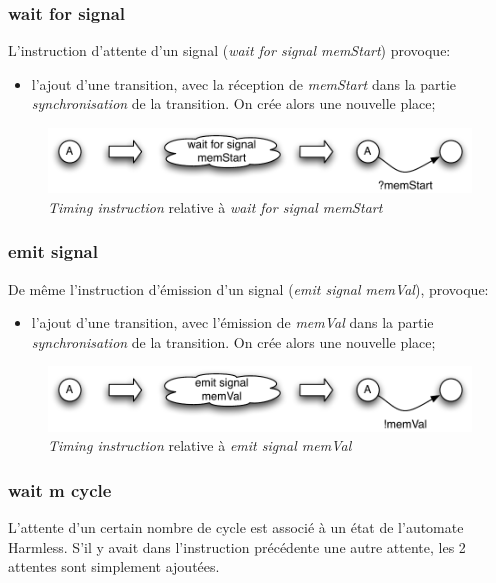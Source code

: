 \documentclass[11pt,a4paper]{article}
\begin{document}
\subsubsection{wait for signal}
L'instruction d'attente d'un signal (\emph{wait for signal memStart}) provoque:
\begin{itemize}
\item l'ajout d'une transition, avec la réception de \emph{memStart} dans la partie \emph{synchronisation} de la transition. On crée alors une nouvelle place;
\end{itemize}

\begin{figure}[htbp] %
   \centering
   \includegraphics[width=\linewidth]{automateWaitForSignal.pdf} 
   \caption{\emph{Timing instruction} relative à \emph{wait for signal memStart}}
   \label{fig:automateWaitForSignal}
\end{figure}

\subsubsection{emit signal}
De même l'instruction d'émission d'un signal (\emph{emit signal memVal}), provoque:
\begin{itemize}
\item l'ajout d'une transition, avec l'émission de \emph{memVal} dans la partie \emph{synchronisation} de la transition. On crée alors une nouvelle place;
\end{itemize}

\begin{figure}[htbp] %
   \centering
   \includegraphics[width=\linewidth]{automateEmitSignal.pdf} 
   \caption{\emph{Timing instruction} relative à \emph{emit signal memVal}}
   \label{fig:automateEmitSignal}
\end{figure}

\subsubsection{wait m cycle}
L'attente d'un certain nombre de cycle est associé à un état de l'automate Harmless. S'il y avait dans l'instruction précédente une autre attente, les 2 attentes sont simplement ajoutées.
\end{document}
